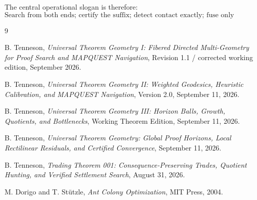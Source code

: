\documentclass[11pt]{article}
\begin{document}
The central operational slogan is therefore:
\[
\boxed{\text{Search from both ends; certify the suffix; detect contact exactly; fuse only through the verifier.}}
\]

\begin{thebibliography}{9}

B. Tenneson,
\emph{Universal Theorem Geometry I: Fibered Directed Multi-Geometry for Proof Search and MAPQUEST Navigation},
Revision 1.1 / corrected working edition, September 2026.

B. Tenneson,
\emph{Universal Theorem Geometry II: Weighted Geodesics, Heuristic Calibration, and MAPQUEST Navigation},
Version 2.0, September 11, 2026.

B. Tenneson,
\emph{Universal Theorem Geometry III: Horizon Balls, Growth, Quotients, and Bottlenecks},
Working Theorem Edition, September 11, 2026.

B. Tenneson,
\emph{Universal Theorem Geometry: Global Proof Horizons, Local Rectilinear Residuals, and Certified Convergence},
September 11, 2026.

B. Tenneson,
\emph{Trading Theorem 001: Consequence-Preserving Trades, Quotient Hunting, and Verified Settlement Search},
August 31, 2026.

M. Dorigo and T. St\"utzle,
\emph{Ant Colony Optimization},
MIT Press, 2004.

\end{thebibliography}
\end{document}
